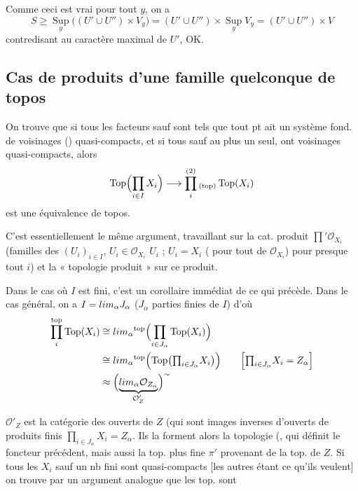 \documentclass[11pt,a4paper]{article}
\begin{document}
Comme ceci est vrai pour tout $y$, on a
\[
S \geqslant \operatorname*{Sup}_{y}\bigl((U' \cup U'') \times V_{y}\bigr)
= (U' \cup U'') \times \operatorname*{Sup}_{y} V_{y}
= (U' \cup U'') \times V
\]
contredisant au caractère maximal de $U'$, OK.

\subsection*{Cas de produits  d'une famille quelconque de topos}

On trouve que si tous les facteurs sauf   sont
tels que tout pt ait un système fond. de voisinages () quasi-compacts, et si tous sauf au plus un seul, ont \struck{\ill{}}
voisinages quasi-compacts, alors
\[
\operatorname{Top}\Bigl(\prod_{i \in I} X_{i}\Bigr) \longrightarrow
\prod_{i}^{(2)}{}_{(\mathrm{top})} \operatorname{Top}(X_{i})
\]
est une équivalence de topos.

C'est essentiellement le même argument, travaillant sur la cat. produit
 $\prod' \mathcal{O}_{X_{i}}$ (familles des
$(U_{i})_{i \in I}$, $U_{i} \in \mathcal{O}_{X_{i}}$ \ill{} $U_{i}$ ;
$U_{i} = X_{i}$ (\struck{\ill{}} pour  tout \ill{} de
$\mathcal{O}_{X_{i}}$) pour presque tout $i$) et la « topologie produit » sur ce
produit.

Dans le cas où $I$ est fini, c'est un corollaire immédiat de ce qui précède.
Dans le cas général, on a $I = \varinjlim_{\alpha} J_{\alpha}$ ($J_{\alpha}$
parties finies de $I$) d'où
\begin{align}
\prod_{i}^{\mathrm{top}} \operatorname{Top}(X_{i})
&\cong \varprojlim_{\alpha}{}^{\mathrm{top}}
   \Bigl(\prod_{i \in J_{\alpha}} \operatorname{Top}(X_{i})\Bigr) \nonumber\\
&\cong \varprojlim_{\alpha}{}^{\mathrm{top}}
   \Bigl(\operatorname{Top}\bigl({\textstyle\prod_{i \in J_{\alpha}}} X_{i}\bigr)\Bigr)
   \qquad\Bigl[{\textstyle\prod_{i \in J_{\alpha}}} X_{i} = Z_{\alpha}\Bigr] \nonumber\\
&\approx \Bigl(\underbrace{\varinjlim_{\alpha} \mathcal{O}_{Z_{\alpha}}}_{\mathcal{O}'_{Z}}\Bigr)^{\sim} \nonumber
\end{align}

$\mathcal{O}'_{Z}$ est la catégorie des ouverts de $Z$ 
(qui sont images inverses  d'ouverts de produits finis
$\prod_{i \in J_{\alpha}} X_{i} = Z_{\alpha}$. Ils la forment 
alors la topologie \ill{} (\struck{$\varprojlim$}, qui définit \ill{} le
foncteur précédent, mais aussi la top. plus fine $\pi'$ provenant de la top. de
$Z$. Si tous les $X_{i}$ sauf un nb fini sont quasi-compacts [les autres étant
ce qu'ils veulent] on trouve par un argument analogue  que les
top. sont
\end{document}
